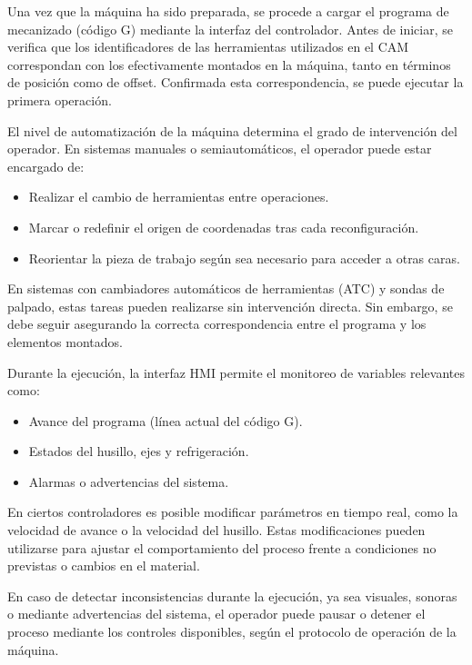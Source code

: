 Una vez que la máquina ha sido preparada, se procede a cargar el programa de mecanizado (código G) mediante la interfaz del controlador. Antes de iniciar, se verifica que los identificadores de las herramientas utilizados en el CAM correspondan con los efectivamente montados en la máquina, tanto en términos de posición como de offset. Confirmada esta correspondencia, se puede ejecutar la primera operación.

El nivel de automatización de la máquina determina el grado de intervención del operador. En sistemas manuales o semiautomáticos, el operador puede estar encargado de:

\begin{itemize}
	\item Realizar el cambio de herramientas entre operaciones.
	\item Marcar o redefinir el origen de coordenadas tras cada reconfiguración.
	\item Reorientar la pieza de trabajo según sea necesario para acceder a otras caras.
\end{itemize}

En sistemas con cambiadores automáticos de herramientas (ATC) y sondas de palpado, estas tareas pueden realizarse sin intervención directa. Sin embargo, se debe seguir asegurando la correcta correspondencia entre el programa y los elementos montados.

Durante la ejecución, la interfaz HMI permite el monitoreo de variables relevantes como:

\begin{itemize}
	\item Avance del programa (línea actual del código G).
	\item Estados del husillo, ejes y refrigeración.
	\item Alarmas o advertencias del sistema.
\end{itemize}

En ciertos controladores es posible modificar parámetros en tiempo real, como la velocidad de avance o la velocidad del husillo. Estas modificaciones pueden utilizarse para ajustar el comportamiento del proceso frente a condiciones no previstas o cambios en el material.

En caso de detectar inconsistencias durante la ejecución, ya sea visuales, sonoras o mediante advertencias del sistema, el operador puede pausar o detener el proceso mediante los controles disponibles, según el protocolo de operación de la máquina.


